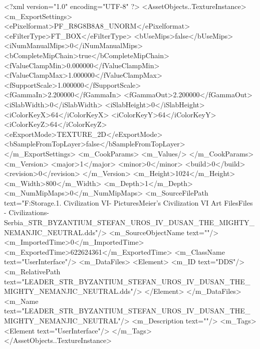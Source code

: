 <?xml version="1.0" encoding="UTF-8" ?>
<AssetObjects..TextureInstance>
	<m_ExportSettings>
		<ePixelformat>PF_R8G8B8A8_UNORM</ePixelformat>
		<eFilterType>FT_BOX</eFilterType>
		<bUseMips>false</bUseMips>
		<iNumManualMips>0</iNumManualMips>
		<bCompleteMipChain>true</bCompleteMipChain>
		<fValueClampMin>0.000000</fValueClampMin>
		<fValueClampMax>1.000000</fValueClampMax>
		<fSupportScale>1.000000</fSupportScale>
		<fGammaIn>2.200000</fGammaIn>
		<fGammaOut>2.200000</fGammaOut>
		<iSlabWidth>0</iSlabWidth>
		<iSlabHeight>0</iSlabHeight>
		<iColorKeyX>64</iColorKeyX>
		<iColorKeyY>64</iColorKeyY>
		<iColorKeyZ>64</iColorKeyZ>
		<eExportMode>TEXTURE_2D</eExportMode>
		<bSampleFromTopLayer>false</bSampleFromTopLayer>
	</m_ExportSettings>
	<m_CookParams>
		<m_Values/>
	</m_CookParams>
	<m_Version>
		<major>1</major>
		<minor>0</minor>
		<build>0</build>
		<revision>0</revision>
	</m_Version>
	<m_Height>1024</m_Height>
	<m_Width>800</m_Width>
	<m_Depth>1</m_Depth>
	<m_NumMipMaps>0</m_NumMipMaps>
	<m_SourceFilePath text="F:\Mod Storage\2.1. Civilization VI\Mods\Archive - Pictures\Sid Meier's Civilization VI Art Files\Art Files - Civilizations\Civilization - Serbia\LEADER_STR_BYZANTIUM_STEFAN_UROS_IV_DUSAN_THE_MIGHTY_NEMANJIC_NEUTRAL.dds"/>
	<m_SourceObjectName text=""/>
	<m_ImportedTime>0</m_ImportedTime>
	<m_ExportedTime>622624361</m_ExportedTime>
	<m_ClassName text="UserInterface"/>
	<m_DataFiles>
		<Element>
			<m_ID text="DDS"/>
			<m_RelativePath text="LEADER_STR_BYZANTIUM_STEFAN_UROS_IV_DUSAN_THE_MIGHTY_NEMANJIC_NEUTRAL.dds"/>
		</Element>
	</m_DataFiles>
	<m_Name text="LEADER_STR_BYZANTIUM_STEFAN_UROS_IV_DUSAN_THE_MIGHTY_NEMANJIC_NEUTRAL"/>
	<m_Description text=""/>
	<m_Tags>
		<Element text="UserInterface"/>
	</m_Tags>
</AssetObjects..TextureInstance>

